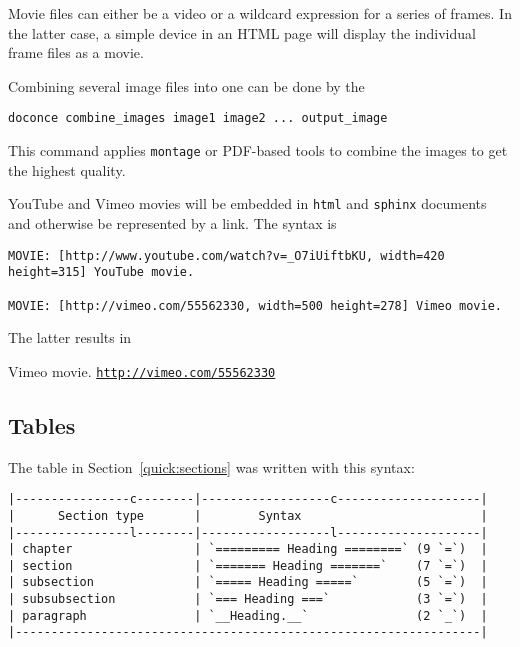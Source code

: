 \documentclass[%
oneside,                 %
final,                   %
10pt]{article}
\begin{document}
Movie files can either be a video or a wildcard expression for a
series of frames. In the latter case, a simple device in an HTML page
will display the individual frame files as a movie.

Combining several image files into one can be done by the
\begin{Verbatim}[numbers=none,fontsize=\fontsize{9pt}{9pt},baselinestretch=0.85,xleftmargin=0mm]
doconce combine_images image1 image2 ... output_image
\end{Verbatim}
This command applies \Verb!montage! or PDF-based tools to combine the images
to get the highest quality.

YouTube and Vimeo movies will be embedded in \Verb!html! and \Verb!sphinx! documents
and otherwise be represented by a link. The syntax is

\begin{Verbatim}[numbers=none,fontsize=\fontsize{9pt}{9pt},baselinestretch=0.85,xleftmargin=0mm]
MOVIE: [http://www.youtube.com/watch?v=_O7iUiftbKU, width=420 height=315] YouTube movie.

MOVIE: [http://vimeo.com/55562330, width=500 height=278] Vimeo movie.

\end{Verbatim}
The latter results in

 Vimeo movie. \href{{http://vimeo.com/55562330}}{\nolinkurl{http://vimeo.com/55562330}}


\subsection{Tables}

The table in Section~\ref{quick:sections} was written with this
syntax:
\begin{Verbatim}[numbers=none,fontsize=\fontsize{9pt}{9pt},baselinestretch=0.85,xleftmargin=0mm]
|----------------c--------|------------------c--------------------|
|      Section type       |        Syntax                         |
|----------------l--------|------------------l--------------------|
| chapter                 | `========= Heading ========` (9 `=`)  |
| section                 | `======= Heading =======`    (7 `=`)  |
| subsection              | `===== Heading =====`        (5 `=`)  |
| subsubsection           | `=== Heading ===`            (3 `=`)  |
| paragraph               | `__Heading.__`               (2 `_`)  |
|-----------------------------------------------------------------|
\end{Verbatim}
\end{document}
